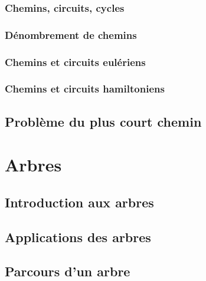 \documentclass[
  letterpaper,
]{scrbook}
\theoremstyle{plain}
\theoremstyle{definition}
\theoremstyle{definition}
\theoremstyle{remark}
\begin{document}
\hypertarget{chemins-circuits-cycles}{%
\subsection{Chemins, circuits, cycles}\label{chemins-circuits-cycles}}

\hypertarget{duxe9nombrement-de-chemins}{%
\subsection{Dénombrement de chemins}\label{duxe9nombrement-de-chemins}}

\hypertarget{chemins-et-circuits-euluxe9riens}{%
\subsection{Chemins et circuits
eulériens}\label{chemins-et-circuits-euluxe9riens}}

\hypertarget{chemins-et-circuits-hamiltoniens}{%
\subsection{Chemins et circuits
hamiltoniens}\label{chemins-et-circuits-hamiltoniens}}

\hypertarget{probluxe8me-du-plus-court-chemin}{%
\section{Problème du plus court
chemin}\label{probluxe8me-du-plus-court-chemin}}


\hypertarget{arbres}{%
\chapter{Arbres}\label{arbres}}

\hypertarget{introduction-aux-arbres}{%
\section{Introduction aux arbres}\label{introduction-aux-arbres}}

\hypertarget{applications-des-arbres}{%
\section{Applications des arbres}\label{applications-des-arbres}}

\hypertarget{parcours-dun-arbre}{%
\section{Parcours d'un arbre}\label{parcours-dun-arbre}}
\end{document}
